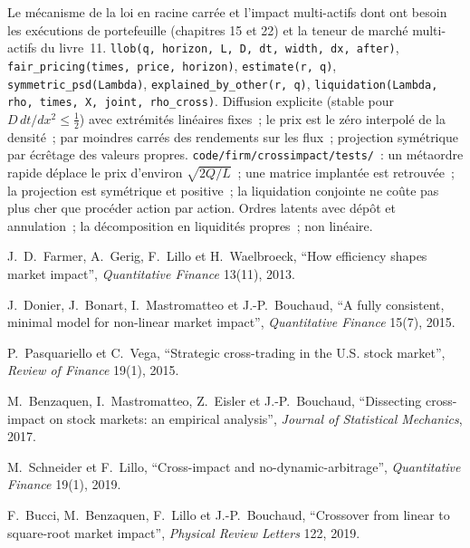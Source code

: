 \begin{build}
 Le mécanisme de la loi en racine carrée et l'impact multi-actifs dont ont besoin les exécutions de portefeuille (chapitres 15 et 22) et la
teneur de marché multi-actifs du livre~11.
 \texttt{llob(q, horizon, L, D, dt, width, dx, after)}, \texttt{fair\_pricing(times, price, horizon)}, \texttt{estimate(r, q)},
\texttt{symmetric\_psd(Lambda)}, \texttt{explained\_by\_other(r, q)}, \texttt{liquidation(Lambda, rho, times, X, joint, rho\_cross)}.
 Diffusion explicite (stable pour $D\,dt/dx^2\le\tfrac12$) avec extrémités linéaires fixes~; le prix est le zéro interpolé de la densité~;
 par moindres carrés des rendements sur les flux~; projection symétrique par écrêtage des valeurs propres.
 \texttt{code/firm/crossimpact/tests/}~: un métaordre rapide déplace le prix d'environ $\sqrt{2Q/L}$~; une matrice implantée est retrouvée~;
la projection est symétrique et positive~; la liquidation conjointe ne coûte pas plus cher que procéder action par action.
 Ordres latents avec dépôt et annulation~; la décomposition en liquidités propres~;  non linéaire.
\end{build}

\begin{omsources}
\item J.~D.~Farmer, A.~Gerig, F.~Lillo et H.~Waelbroeck, ``How efficiency shapes market impact'', \emph{Quantitative Finance} 13(11), 2013.
\item J.~Donier, J.~Bonart, I.~Mastromatteo et J.-P.~Bouchaud, ``A fully consistent, minimal model for non-linear market impact'', \emph{Quantitative
Finance} 15(7), 2015.
\item P.~Pasquariello et C.~Vega, ``Strategic cross-trading in the U.S. stock market'', \emph{Review of Finance} 19(1), 2015.
\item M.~Benzaquen, I.~Mastromatteo, Z.~Eisler et J.-P.~Bouchaud, ``Dissecting cross-impact on stock markets: an empirical analysis'', \emph{Journal of
Statistical Mechanics}, 2017.
\item M.~Schneider et F.~Lillo, ``Cross-impact and no-dynamic-arbitrage'', \emph{Quantitative Finance} 19(1), 2019.
\item F.~Bucci, M.~Benzaquen, F.~Lillo et J.-P.~Bouchaud, ``Crossover from linear to square-root market impact'', \emph{Physical Review Letters} 122, 2019.
\end{omsources}

